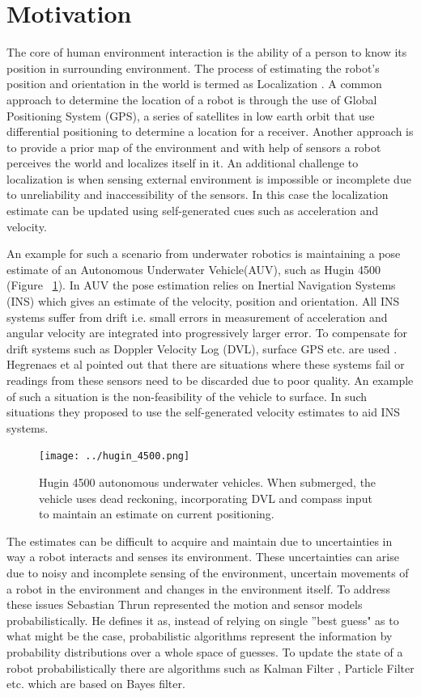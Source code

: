 \documentclass[12pt,draft]{dalcsthesis}
\begin{document}
\section{Motivation}
The core of human environment interaction is the ability of a person to know its position in surrounding environment. The process of estimating the robot's position and orientation in the world is termed as Localization \cite{thrun2005probabilistic}.  A common approach to determine the location of a robot is through the use of Global Positioning System (GPS), a series of satellites in low earth orbit that use differential positioning to determine a location for a receiver.  Another approach is to provide a prior map of the environment and with help of sensors a robot perceives the world and localizes itself in it. An additional challenge to localization is when sensing external environment is impossible or incomplete due to unreliability and inaccessibility of the sensors. In this case the localization estimate can be updated using self-generated cues such as acceleration and velocity.  

An example for such a scenario from underwater robotics is maintaining a pose estimate of an Autonomous Underwater Vehicle(AUV), such as Hugin 4500 (Figure ~\ref{fig-Hugin 4500}). In AUV the pose estimation relies on Inertial Navigation Systems (INS) which gives an estimate of the velocity, position and orientation.  All INS systems suffer from drift i.e. small errors in measurement of acceleration and angular velocity are integrated into progressively larger error.  To compensate for drift systems such as Doppler Velocity Log (DVL), surface GPS etc. are used \cite{Lammas2004} \cite{leonard1998autonomous}. Hegrenaes et al \cite{Hegrenes2008} pointed out that there are situations where these systems fail or readings from these sensors need to be discarded due to poor quality.  An example of such a situation is the non-feasibility of the vehicle to surface.  In such situations they proposed to use the self-generated velocity estimates to aid INS systems. 
\begin{figure}
  \centering
     {\texttt{[image: ../hugin\_4500.png]}}
  \caption{\label{fig-Hugin 4500} Hugin 4500 autonomous underwater vehicles. When submerged, the vehicle uses dead reckoning, incorporating DVL and compass input to maintain an estimate on current positioning.
}
\end{figure}


The estimates can be difficult to acquire and maintain due to uncertainties in way a robot interacts and senses its environment. These uncertainties can arise due to noisy and incomplete sensing of the environment, uncertain movements of a robot in the environment and changes in the environment itself.  To address these issues Sebastian Thrun \cite{thrun2005probabilistic} represented the motion and sensor models probabilistically. He defines it as, instead of relying on single ''best guess" as to what might be the case, probabilistic algorithms represent the information by probability distributions over a whole space of guesses.  To update the state of a robot probabilistically there are algorithms such as Kalman Filter \cite{kalman1960new}, Particle Filter \cite{gordon1993novel} etc. which are based on Bayes filter. 
\end{document}
